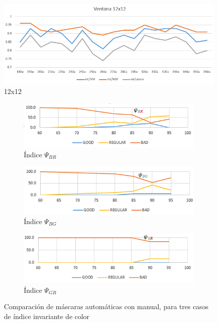 \begin{figure}[h!]
    \includegraphics[width=\textwidth]{Imagenes/filter 12x12.png}
     \hfill
     \caption{12x12}
    \label{filter12x12}
\end{figure}



\begin{figure}[h!]
    \centering
  \begin{subfigure}[b]{0.8\textwidth}
    \includegraphics[width=\textwidth]{Imagenes/psiBR.png}
     \hfill
     \caption{Índice $\Psi_{BR}$}
    \label{azulrojo}
 \end{subfigure}

 \begin{subfigure}[b]{0.8\textwidth}
    \includegraphics[width=\textwidth]{Imagenes/psiBG.png}
     \hfill
     \caption{Índice $\Psi_{BG}$}
    \label{azulverde}
 \end{subfigure}

 \begin{subfigure}[b]{0.8\textwidth}
    \includegraphics[width=\textwidth]{Imagenes/psiGR.png}
     \hfill
     \caption{Índice $\Psi_{GR}$}
    \label{verderojo}
 \end{subfigure}
 \caption{Comparación de máscaras automáticas con manual, para tres casos de índice invariante de color}
        \label{compara_mascara}
\end{figure}